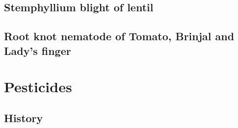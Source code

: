 \documentclass[
  openany]{book}
\begin{document}
\hypertarget{stemphyllium-blight-of-lentil}{%
\subsection{Stemphyllium blight of lentil}\label{stemphyllium-blight-of-lentil}}

\hypertarget{root-knot-nematode-of-tomato-brinjal-and-ladys-finger}{%
\subsection{Root knot nematode of Tomato, Brinjal and Lady's finger}\label{root-knot-nematode-of-tomato-brinjal-and-ladys-finger}}

\hypertarget{pesticides}{%
\section{Pesticides}\label{pesticides}}

\hypertarget{history}{%
\subsection{History}\label{history}}
\end{document}
